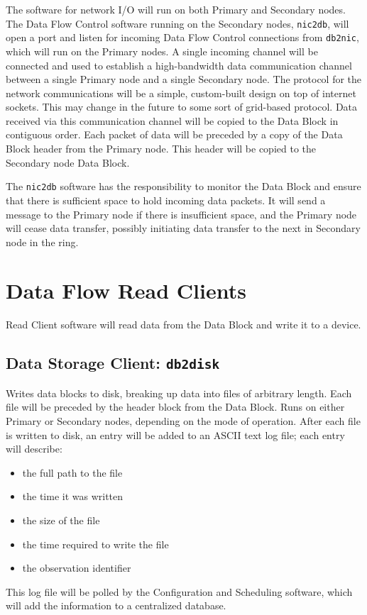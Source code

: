 The software for network I/O will run on both Primary and Secondary
nodes.  The Data Flow Control software running on the Secondary nodes,
{\tt nic2db}, will open a port and listen for incoming Data Flow
Control connections from {\tt db2nic}, which will run on the Primary
nodes.  A single incoming channel will be connected and used to
establish a high-bandwidth data communication channel between a single
Primary node and a single Secondary node.  The protocol for the
network communications will be a simple, custom-built design on top of
internet sockets.  This may change in the future to some sort of
grid-based protocol.  Data received via this communication channel
will be copied to the Data Block in contiguous order.  Each packet of
data will be preceded by a copy of the Data Block header from the
Primary node.  This header will be copied to the Secondary node Data
Block.

The {\tt nic2db} software has the responsibility to monitor the Data
Block and ensure that there is sufficient space to hold incoming data
packets.  It will send a message to the Primary node if there is
insufficient space, and the Primary node will cease data transfer,
possibly initiating data transfer to the next in Secondary node in the
ring.

\section{Data Flow Read Clients}

Read Client software will read data from the Data Block and write it
to a device.

\subsection{Data Storage Client: {\tt db2disk}}

Writes data blocks to disk, breaking up data into files of arbitrary
length.  Each file will be preceded by the header block from the Data
Block.  Runs on either Primary or Secondary nodes, depending on the
mode of operation.  After each file is written to disk, an entry will
be added to an ASCII text log file; each entry will describe:
\begin{itemize}
\item the full path to the file
\item the time it was written
\item the size of the file
\item the time required to write the file
\item the observation identifier
\end{itemize}
This log file will be polled by the Configuration and Scheduling
software, which will add the information to a centralized database.


